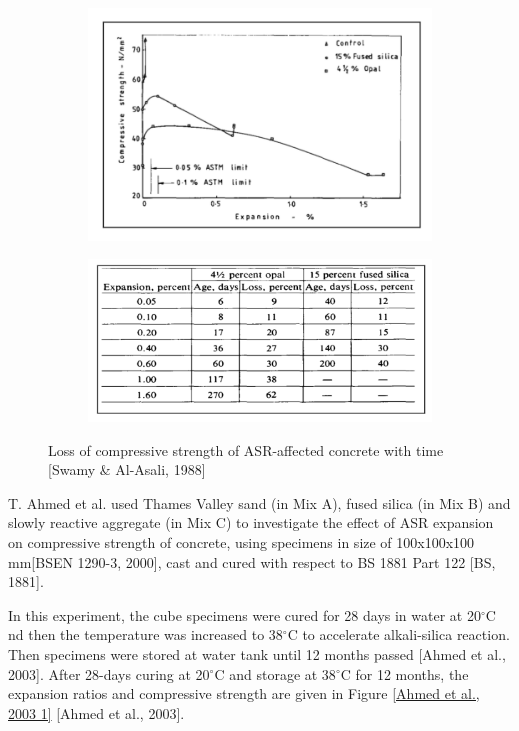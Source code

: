 \begin{figure}[h!]
\centering
\begin{subfigure}{.8\textwidth}
  \centering
  \includegraphics[width=1.0\linewidth]{Reference/temp5.png}
\end{subfigure}
\begin{subfigure}{.8\textwidth}
  \centering
  \includegraphics[width=1.0\linewidth]{Reference/temp6.png}
\end{subfigure}
\caption{Loss of compressive strength of ASR-affected concrete with time [Swamy \& Al-Asali, 1988]}
\label{Swamy, Al-Asali, 1988 2}
\end{figure}

\clearpage
T. Ahmed et al.\cite{Ahmed} used Thames Valley sand (in Mix A), fused silica (in Mix B) and slowly reactive aggregate (in Mix C) to investigate the effect of ASR expansion on compressive strength of concrete, using specimens in size of 100x100x100 mm[BSEN 1290-3, 2000], cast and cured with respect to BS 1881 Part 122 [BS, 1881].

In this experiment, the cube specimens were cured for 28 days in water at 20$^\circ$C nd then the temperature was increased to 38$^\circ$C to accelerate alkali-silica reaction. Then specimens were stored at water tank until 12 months passed [Ahmed et al., 2003]. After 28-days curing at 20$^\circ$C and storage at 38$^\circ$C for 12 months, the expansion ratios and compressive strength are given in Figure \ref{Ahmed et al., 2003 1} [Ahmed et al., 2003].

